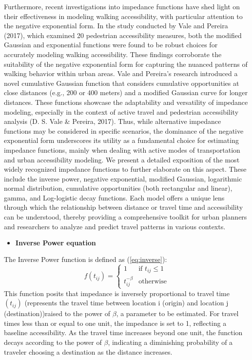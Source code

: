 \documentclass[12pt,twoside]{reedthesis}
\providecommand{\tightlist}{%
  \setlength{\itemsep}{0pt}\setlength{\parskip}{0pt}}
\begin{document}
Furthermore, recent investigations into impedance functions have shed light on their effectiveness in modeling walking accessibility, with particular attention to the negative exponential form. In the study conducted by Vale and Pereira (2017), which examined 20 pedestrian accessibility measures, both the modified Gaussian and exponential functions were found to be robust choices for accurately modeling walking accessibility. These findings corroborate the suitability of the negative exponential form for capturing the nuanced patterns of walking behavior within urban areas. Vale and Pereira's research introduced a novel cumulative Gaussian function that considers cumulative opportunities at close distances (e.g., 200 or 400 meters) and a modified Gaussian curve for longer distances. These functions showcase the adaptability and versatility of impedance modeling, especially in the context of active travel and pedestrian accessibility analysis (D. S. Vale \& Pereira, 2017). Thus, while alternative impedance functions may be considered in specific scenarios, the dominance of the negative exponential form underscores its utility as a fundamental choice for estimating impedance functions, mainly when dealing with active modes of transportation and urban accessibility modeling. We present a detailed exposition of the most widely recognized impedance functions to further elaborate on this aspect. These include the inverse power, negative exponential, modified Gaussian, logarithmic normal distribution, cumulative opportunities (both rectangular and linear), gamma, and Log-logistic decay functions. Each model offers a unique lens through which the relationship between distance or travel time and accessibility can be understood, thereby providing a comprehensive toolkit for urban planners and researchers to analyze and predict travel patterns in various contexts.
\begin{itemize}
\tightlist
\item
  \textbf{Inverse Power equation}
\end{itemize}
The Inverse Power function is defined as (\eqref{eq:inverse}):
\begin{equation}
f(t_{ij}) =
\begin{cases}
  1 & \text{if } t_{ij} \le 1 \\
  t_{ij}^{-\beta} & \text{otherwise}
\end{cases}
\label{eq:inverse}
\end{equation}
This function posits that impedance is inversely proportional to travel time \((t_{ij})\) (represents the travel time between location i (origin) and location j (destination))raised to the power of \(\beta\), a parameter to be estimated. For travel times less than or equal to one unit, the impedance is set to 1, reflecting a baseline accessibility. As the travel time increases beyond one unit, the function decays according to the power of \(\beta\), indicating a diminishing probability of a traveler choosing a destination as the distance increases.
\end{document}
